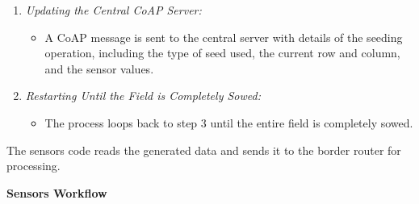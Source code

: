 \begin{enumerate}
    \item \textit{Updating the Central CoAP Server:}
    \begin{itemize}
        \item A CoAP message is sent to the central server with details of the seeding operation, including the type of seed used, the current row and column, and the sensor values.
    \end{itemize}
    
    \item \textit{Restarting Until the Field is Completely Sowed:}
    \begin{itemize}
        \item The process loops back to step 3 until the entire field is completely sowed.
    \end{itemize}
    
\end{enumerate}

\newpage


The sensors code reads the generated data and sends it to the border router for processing.


\textbf{Sensors Workflow}

